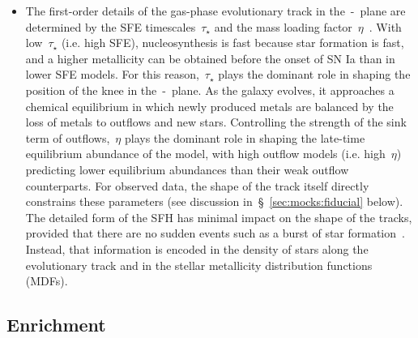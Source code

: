 \documentclass[ms.tex]{subfiles}
\begin{document}
\begin{itemize}
	\item The first-order details of the gas-phase evolutionary track in
	the~\afe-\feh~plane are determined by the SFE timescales~$\tau_\star$ and
	the mass loading factor~$\eta$~\citep{Weinberg2017}.
	With low~$\tau_\star$ (i.e. high SFE), nucleosynthesis is fast because
	star formation is fast, and a higher metallicity can be obtained before
	the onset of SN Ia than in lower SFE models.
	For this reason,~$\tau_\star$ plays the dominant role in shaping the
	position of the knee in the~\afe-\feh~plane.
	As the galaxy evolves, it approaches a chemical equilibrium in which
	newly produced metals are balanced by the loss of metals to outflows
	and new stars.
	Controlling the strength of the sink term of outflows,~$\eta$ plays
	the dominant role in shaping the late-time equilibrium abundance of the
	model, with high outflow models (i.e. high~$\eta$) predicting lower
	equilibrium abundances than their weak outflow counterparts.
	For observed data, the shape of the track itself directly constrains
	these parameters (see discussion in~\S~\ref{sec:mocks:fiducial} below).
	The detailed form of the SFH has minimal impact on the shape of the
	tracks, provided that there are no sudden events such as a burst of
	star formation~\citep{Weinberg2017, Johnson2020}.
	Instead, that information is encoded in the density of stars along the
	evolutionary track and in the stellar metallicity distribution functions
	(MDFs).


\end{itemize}

\subsection{Enrichment}
\label{sec:onezone:enrichment}

\end{document}
